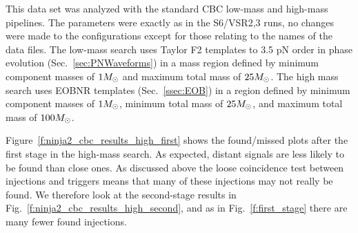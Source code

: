 This data set was analyzed with the standard CBC low-mass and
high-mass pipelines.  The parameters were exactly as in the S6/VSR2,3
runs, no changes were made to the configurations except for those
relating to the names of the data files.  The low-mass search uses
Taylor F2 templates to 3.5 pN order in phase evolution
(Sec.~\ref{sec:PNWaveforms}) in a mass region defined by minimum
component masses of $1 M_\odot$ and maximum total mass of $25 M_\odot$.
The high mass search uses EOBNR templates (Sec.~\ref{ssec:EOB}) in
a region defined by minimum component masses of $1 M_\odot$, minimum
total mass of $25 M_\odot$, and maximum total mass of $100 M_\odot$.


Figure~\ref{f:ninja2_cbc_results_high_first} shows the found/missed plots
after the first stage in the high-mass search.  As expected, distant
signals are less likely to be found than close ones.  As discussed
above the loose coincidence test between injections and triggers means
that many of these injections may not really be found.  We therefore
look at the second-stage results in
Fig.~\ref{f:ninja2_cbc_results_high_second}, and as in
Fig.~\ref{f:first_stage} there are many fewer found injections.  


